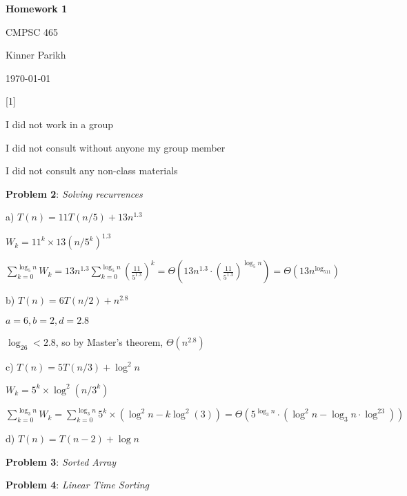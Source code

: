 \documentclass{article} %
\newcommand{\question}[2][]{\begin{flushleft}
        \textbf{Problem #1}: \textit{#2}

\end{flushleft}}
\newcommand{\maketitletwo}[2][]{\begin{center}
        \Large{\textbf{Homework #1}
            
            CMPSC 465} %
        \vspace{5pt}
        
        \normalsize{Kinner Parikh  %
        
        \today}        %
        \vspace{40pt}


        \newpage
        
\end{center}}
\begin{document}
    \maketitletwo[1]  %

    \question[1]{}
    \begin{center}
        
        I did not work in a group
    
        I did not consult without anyone my group member
    
        I did not consult any non-class materials
    \end{center}
    
    \newpage

    \question[2]{Solving recurrences}

    a) $T(n) = 11T(n / 5) + 13n^{1.3}$



    $W_k = 11^k \times 13(n/5^k)^{1.3}$

    $\sum_{k = 0}^{\log_5n} W_k = 13n^{1.3} \sum_{k = 0}^{\log_5n} \left(\frac{11}{5^{1.3}}\right)^k = \Theta(13n^{1.3} \cdot \left(\frac{11}{5^{1.3}}\right)^{\log_5n}) = \boxed{\Theta(13n^{\log_511})}$

    \vspace{5pt}

    b) $T(n) = 6T(n / 2) + n^{2.8}$

    $ a = 6, b = 2, d = 2.8$

    $\log_26 < 2.8$, so by Master's theorem, $\boxed{\Theta(n^{2.8})}$

    \vspace{5pt}

    c) $T(n) = 5T(n / 3) + \log^2n$

    $W_k = 5^k \times \log^2(n/3^k)$

    $\sum_{k = 0}^{\log_3n} W_k = \sum_{k = 0}^{\log_3n} 5^k \times (\log^2n - k\log^2(3)) = \Theta(5^{\log_3n} \cdot (\log^2n - \log_3n \cdot \log^23))$

    \vspace{5pt}

    d) $T(n) = T(n - 2) + \log n$

    \newpage

    \question[3]{Sorted Array}

    \newpage
    
    \question[4]{Linear Time Sorting}
\end{document}

